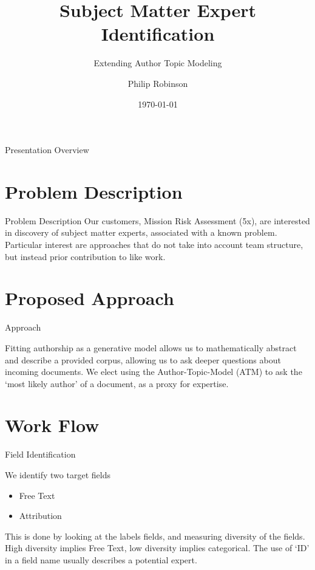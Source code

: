 \documentclass[10pt]{beamer}
\title{Subject Matter Expert Identification}
\subtitle{Extending Author Topic Modeling}
\author{Philip Robinson}
\date{\today}
\institute{Presented to 5x \\ NASA - Jet Propulsion Lab}
\begin{document}
\begin{frame}
  \titlepage

\end{frame}

\begin{frame}{Presentation Overview}
  \tableofcontents



\end{frame}

\section{Problem Description}

\begin{frame}{Problem Description}
  Our customers, Mission Risk Assessment (5x), are interested in discovery of subject matter experts, associated with a known problem. Particular interest are approaches that do not take into account team structure, but instead prior contribution to like work.


\end{frame}

\section{Proposed Approach}

\begin{frame}{Approach}

  Fitting authorship as a generative model allows us to mathematically abstract and describe a provided corpus, allowing us to ask deeper questions about incoming documents. We elect using the Author-Topic-Model (ATM) to ask the `most likely author' of a document, as a proxy for expertise.


\end{frame}

\section{Work Flow}

\begin{frame}{Field Identification}

  We identify two target fields
  \begin{itemize}
  \item Free Text
  \item Attribution
  \end{itemize}

  This is done by looking at the labels fields, and measuring diversity of the fields. High diversity implies Free Text, low diversity implies categorical. The use of `ID' in a field name usually describes a potential expert.


\end{frame}
\end{document}
